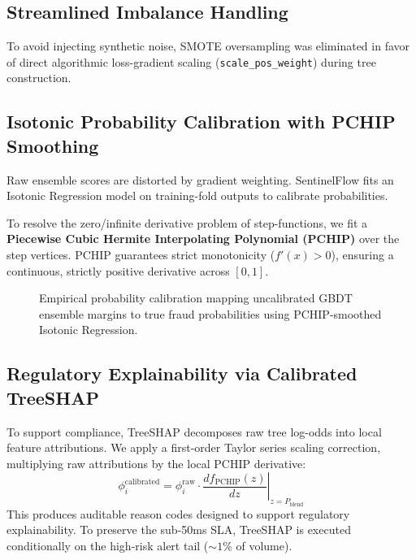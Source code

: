\documentclass[conference]{IEEEtran}
\begin{document}
\subsection{Streamlined Imbalance Handling}
To avoid injecting synthetic noise, SMOTE oversampling was eliminated in favor of direct algorithmic loss-gradient scaling (\texttt{scale\_pos\_weight}) during tree construction.

\subsection{Isotonic Probability Calibration with PCHIP Smoothing}
Raw ensemble scores are distorted by gradient weighting. SentinelFlow fits an Isotonic Regression model on training-fold outputs to calibrate probabilities. 

To resolve the zero/infinite derivative problem of step-functions, we fit a \textbf{Piecewise Cubic Hermite Interpolating Polynomial (PCHIP)} over the step vertices. PCHIP guarantees strict monotonicity ($f'(x) > 0$), ensuring a continuous, strictly positive derivative across $[0, 1]$.

\begin{figure}[t]
\centering
{}
\caption{Empirical probability calibration mapping uncalibrated GBDT ensemble margins to true fraud probabilities using PCHIP-smoothed Isotonic Regression.}
\label{fig:calib}
\end{figure}

\subsection{Regulatory Explainability via Calibrated TreeSHAP}
To support compliance, TreeSHAP decomposes raw tree log-odds into local feature attributions. We apply a first-order Taylor series scaling correction, multiplying raw attributions by the local PCHIP derivative:
\begin{equation}
\phi_{i}^{\text{calibrated}} = \phi_{i}^{\text{raw}} \cdot \left. \frac{df_{\text{PCHIP}}(z)}{dz} \right|_{z = P_{\text{blend}}}
\label{eq:shap}
\end{equation}
This produces auditable reason codes designed to support regulatory explainability. To preserve the sub-50ms SLA, TreeSHAP is executed conditionally on the high-risk alert tail ($\sim1\%$ of volume).
\end{document}
